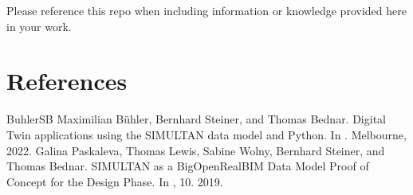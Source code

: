 \documentclass[letterpaper,10pt,english]{jupyterBook}
\begin{document}
\sphinxAtStartPar
Please reference this repo when including information or knowledge provided here in your work.

\sphinxstepscope


\chapter{References}
\label{\detokenize{References:references}}\label{\detokenize{References:id1}}\label{\detokenize{References::doc}}
\begin{sphinxthebibliography}{BuhlerSB}
\sphinxAtStartPar
{}
\sphinxAtStartPar
Maximilian Bühler, Bernhard Steiner, and Thomas Bednar. Digital Twin applications using the SIMULTAN data model and Python. In . Melbourne, 2022.
\sphinxAtStartPar
Galina Paskaleva, Thomas Lewis, Sabine Wolny, Bernhard Steiner, and Thomas Bednar. SIMULTAN as a Big\sphinxhyphen{}Open\sphinxhyphen{}Real\sphinxhyphen{}BIM Data Model \sphinxhyphen{} Proof of Concept for the Design Phase. In , 10. 2019.
\end{sphinxthebibliography}







\renewcommand{\indexname}{Index}
\printindex
\end{document}
